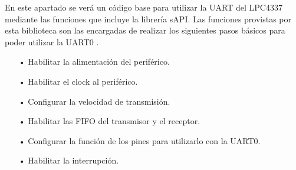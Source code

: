 \documentclass[12pt,letterpaper]{article}
\begin{document}
En este apartado se verá un código base para utilizar la UART del LPC4337 mediante las funciones que incluye la librería sAPI. Las funciones provistas por esta biblioteca son las encargadas de realizar los siguientes pasos básicos para poder utilizar la UART0 \cite{manuallpcuart}.

\begin{enumerate}
\item[•]Habilitar la alimentación del periférico.
\item[•]Habilitar el clock al periférico.
\item[•]Configurar la velocidad de transmisión.
\item[•]Habilitar las FIFO del transmisor y el receptor.
\item[•]Configurar la función de los pines para utilizarlo con la UART0.
\item[•]Habilitar la interrupción.
\end{enumerate}
\end{document}
